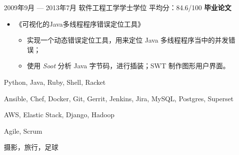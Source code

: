 \documentclass{newresume}
\begin{document}
\begin{body}
\begin{itemize}
	\end{itemize}

	\smallskip
	{2009年9月 --- 2013年7月}
	{软件工程工学学士学位}
	{平均分：84.6/100}
	\textbf{毕业论文}
	\begin{itemize}
	\item 《可视化的Java多线程程序错误定位工具》
	\begin{itemize}
		\item 实现一个动态错误定位工具，用来定位 Java 多线程程序当中的并发错误；
		\item 使用 \textit{Soot} 分析 Java 字节码，进行插装；SWT 制作图形用户界面。
	\end{itemize}
	\end{itemize}
\end{body}

\smallskip


\begin{description}[style=nextline,topsep=1pt]
	\item[语言] Python, Java, Ruby, Shell, Racket
	\item[工具] Ansible, Chef, Docker, Git, Gerrit, Jenkins, Jira, MySQL, Postgres, Superset
	\item[框架] AWS, Elastic Stack, Django, Hadoop
	\item[方法] Agile, Scrum
\end{description}





%




\begin{body}
	摄影，旅行，足球
\end{body}
\end{document}
